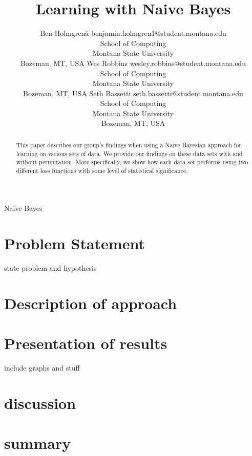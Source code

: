 \documentclass[twoside,11pt]{article}
\begin{document}
\title{Learning with Naive Bayes}

\author{\name Ben Holmgren\u{a} \email benjamin.holmgren1@student.montana.edu \\
       \addr School of Computing\\
       Montana State University\\
       Bozeman, MT, USA
       \AND
       \name Wes Robbins \email wesley.robbins@student.montana.edu \\
       \addr School of Computing\\
       Montana State University\\
       Bozeman, MT, USA
       \AND
       \name Seth Bassetti \email seth.bassetti@student.montana.edu \\
       \addr School of Computing\\
       Montana State University\\
       Bozeman, MT, USA}

\maketitle

\begin{abstract}%
This paper describes our group's findings when using a Naive Bayesian
approach for learning on various sets of data. We provide our findings on
these data sets with and without permutation. More specifically, we show
how each data set performs using two different loss functions with some
level of statistical significance. 
\end{abstract}


\begin{keywords}
  Naive Bayes
\end{keywords}

\section{Problem Statement}
state problem and hypothesis

\section{Description of approach}

\section{Presentation of results}
include graphs and stuff

\section{discussion}

\section{summary}

\vskip 0.2in

\end{document}
